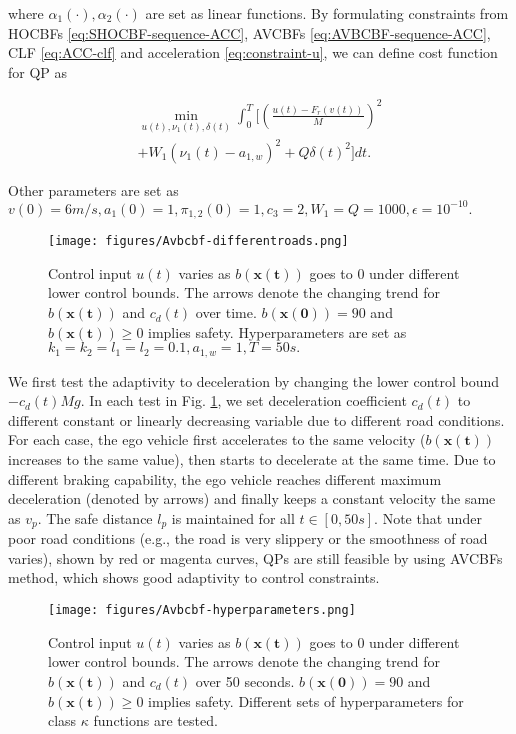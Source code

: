 where $\alpha_{1}(\cdot),\alpha_{2}(\cdot)$ are set as linear functions. By formulating constraints from HOCBFs \eqref{eq:SHOCBF-sequence-ACC}, AVCBFs \eqref{eq:AVBCBF-sequence-ACC}, CLF \eqref{eq:ACC-clf} and acceleration \eqref{eq:constraint-u}, we can define cost function 
 for QP as
 \begin{small}
\begin{equation}
\label{eq:AVBCBF-cost}
\begin{split}
\min_{u(t),\nu_{1}(t),\delta(t)} \int_{0}^{T}[(\frac{u(t)-F_{r}(v(t))}{M})^{2}\\+W_{1}(\nu_{1}(t)-a_{1,w})^{2}+Q\delta(t)^{2}]dt.
\end{split}
\end{equation}
\end{small}
Other parameters are set as $v(0)=6m/s, a_{1}(0)=1, \pi_{1,2}(0)=1, c_{3}=2, W_{1}=Q=1000,\epsilon=10^{-10}.$
\begin{figure}[ht]
    \centering
    \texttt{[image: figures/Avbcbf-differentroads.png]}
    \caption{Control input $u(t)$ varies as $b(\boldsymbol{x(t)})$ goes to 0 under different lower control bounds. The arrows denote the changing trend for $b(\boldsymbol{x(t)})$ and $c_{d}(t)$ over time. $b(\boldsymbol{x(0)})=90$ and $b(\boldsymbol{x(t)})\ge 0$ implies safety. Hyperparameters are set as $k_{1}=k_{2}=l_{1}=l_{2}=0.1, a_{1,w}=1,T=50s.$ }
    \label{fig:AVBCBFs-braking}
\end{figure} 
We first test the adaptivity to deceleration by changing the lower control bound $-c_{d}(t)Mg.$ In each test in Fig. \ref{fig:AVBCBFs-braking}, we set deceleration coefficient $c_{d}(t)$ to different constant or linearly decreasing variable due to different road conditions. For each case, the ego vehicle first accelerates to the same velocity ($b(\boldsymbol{x(t)})$ increases to the same value), then starts to decelerate at the same time. Due to different braking capability, the ego vehicle reaches different maximum deceleration (denoted by arrows) and finally keeps a constant velocity the same as $v_{p}$. The safe distance $l_{p}$ is maintained for all $t\in[0,50s].$ Note that under poor road conditions (e.g., the road is very slippery or the smoothness of road varies), shown by red or magenta curves, QPs are still feasible by using AVCBFs method, which shows good adaptivity to control constraints. 
\begin{figure}[ht]
    \centering
    \texttt{[image: figures/Avbcbf-hyperparameters.png]}
    \caption{Control input $u(t)$ varies as $b(\boldsymbol{x(t)})$ goes to 0 under different lower control bounds. The arrows denote the changing trend for $b(\boldsymbol{x(t)})$ and $c_{d}(t)$ over 50 seconds. $b(\boldsymbol{x(0)})=90$ and $b(\boldsymbol{x(t)})\ge 0$ implies safety. Different sets of hyperparameters for class $\kappa$ functions are tested.}
    \label{fig:AVBCBFs-hyperparameters}
\end{figure} 

